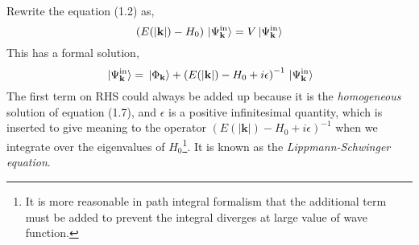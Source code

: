 \documentclass[12pt]{article}
\numberwithin{equation}{section}
\begin{document}
Rewrite the equation (1.2) as,
\begin{equation}
    \left(E(|\mathbf{k}|)-H_0\right)\ket*{\Psi_{\mathbf{k}}^{\text{in}}} = V\ket*{\Psi_{\mathbf{k}}^{\text{in}}}
\end{equation}
This has a formal solution,
\begin{equation}
    \ket*{\Psi_{\mathbf{k}}^{\text{in}}} = \ket*{\Phi_{\mathbf{k}}} + \left(E(|\mathbf{k}|)-H_0+i\epsilon\right)^{-1}\ket*{\Psi_{\mathbf{k}}^{\text{in}}}
\end{equation}
The first term on RHS could always be added up because it is the \textit{homogeneous} solution of equation (1.7), and $\epsilon$ is a positive infinitesimal quantity, which is inserted to give meaning to the operator $(E(|\mathbf{k}|)-H_0+i\epsilon)^{-1}$ when we integrate over the eigenvalues of $H_0$\footnote{It is more reasonable in path integral formalism that the additional term must be added to prevent the integral diverges at large value of wave function.}.
It is known as the \textit{Lippmann-Schwinger equation}.
\end{document}

